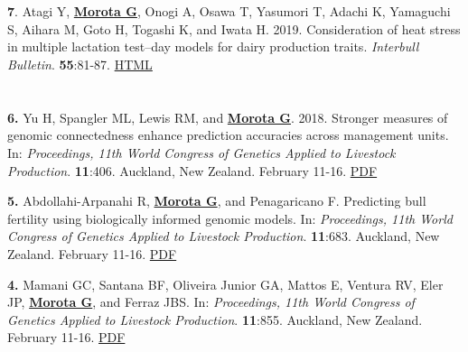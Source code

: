\documentclass[margin,line,10pt]{res}
\newenvironment{list1}{
  \begin{list}{\ding{113}}{%
      \setlength{\itemsep}{0in}
      \setlength{\parsep}{0in} \setlength{\parskip}{0in}
      \setlength{\topsep}{0in} \setlength{\partopsep}{0in} 
      \setlength{\leftmargin}{0.17in}}}{\end{list}}
\begin{document}
\begin{resume}
\begin{list1}
\end{list1}

\section{}
\begin{list1}

\item [{\bf 7}.] Atagi Y, {\bf \underline{Morota G}}, Onogi A, Osawa T, Yasumori T, Adachi K, Yamaguchi S, Aihara M, Goto H, Togashi K, and Iwata H. 2019. Consideration of heat stress in multiple lactation test–day models for dairy production traits. \emph{Interbull Bulletin}. \textbf{55}:81-87. \textcolor{blue}{\href{https://journal.interbull.org/index.php/ib/article/view/185}{HTML}}

\end{list1}


\section{}
\begin{list1}
  
\item [\bf{6}.] Yu H, Spangler ML, Lewis RM, and {\bf \underline{Morota G}}. 2018. 
Stronger measures of genomic connectedness enhance prediction accuracies across management units. In: \emph{Proceedings, 11th World Congress of Genetics Applied to Livestock Production}. \textbf{11}:406. Auckland, New Zealand. February 11-16.
\textcolor{blue}{\href{http://www.wcgalp.org/proceedings/2018/stronger-measures-genomic-connectedness-enhance-prediction-accuracies-across}{PDF}}

\vspace{0.5cm}

\item [\bf{5}.] Abdollahi-Arpanahi R, {\bf \underline{Morota G}}, and Penagaricano F. Predicting bull fertility using biologically informed genomic models.  In: \emph{Proceedings, 11th World Congress of Genetics Applied to Livestock Production}. \textbf{11}:683. Auckland, New Zealand. February 11-16. \textcolor{blue}{\href{http://www.wcgalp.org/proceedings/2018/predicting-bull-fertility-using-biologically-informed-genomic-models}{PDF}}

  \vspace{0.5cm}
  
\item [\bf{4}.] Mamani GC, Santana BF, Oliveira Junior GA, Mattos E, Ventura RV, Eler JP, {\bf \underline{Morota G}}, and Ferraz JBS. In: \emph{Proceedings, 11th World Congress of Genetics Applied to Livestock Production}. \textbf{11}:855. Auckland, New Zealand. February 11-16. \textcolor{blue}{\href{http://www.wcgalp.org/proceedings/2018/effect-inbreeding-productive-traits-nellore-cattle}{PDF}} 


\end{list1}
\end{resume}
\end{document}
